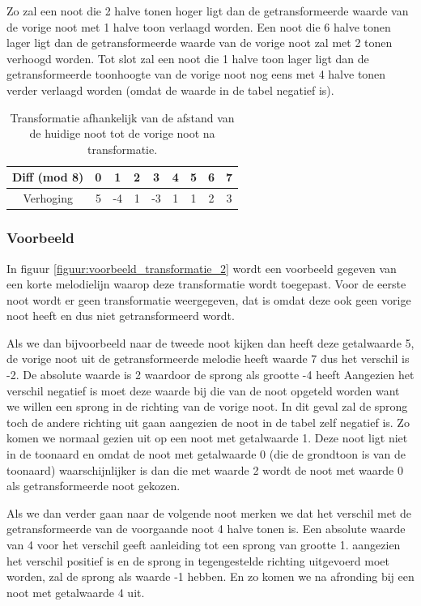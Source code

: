 Zo zal een noot die 2 halve tonen hoger ligt dan de getransformeerde waarde van de vorige noot met 1 halve toon verlaagd worden. Een noot die 6 halve tonen lager ligt dan de getransformeerde waarde van de vorige noot zal met 2 tonen verhoogd worden. Tot slot zal een noot die 1 halve toon lager ligt dan de getransformeerde toonhoogte van de vorige noot nog eens met 4 halve tonen verder verlaagd worden (omdat de waarde in de tabel negatief is).

\begin{table}
  \centering
  \begin{tabular}{c | c c c c c c c c }
    Diff (mod 8) & 0 & 1 & 2 & 3 & 4 & 5 & 6 & 7 \\
    \hline
    \hline
    Verhoging & 5 & -4 & 1 & -3 & 1 & 1 & 2 & 3 \\
  \end{tabular}
  \caption{Transformatie afhankelijk van de afstand van de huidige noot tot de vorige noot na transformatie.}
  \label{tabel:transformatie2}
\end{table}

\subsubsection{Voorbeeld}
In figuur \ref{figuur:voorbeeld_transformatie_2} wordt een voorbeeld gegeven van een korte melodielijn waarop deze transformatie wordt toegepast. Voor de eerste noot wordt er geen transformatie weergegeven, dat is omdat deze ook geen vorige noot heeft en dus niet getransformeerd wordt. 

Als we dan bijvoorbeeld naar de tweede noot kijken dan heeft deze getalwaarde 5, de vorige noot uit de getransformeerde melodie heeft waarde 7 dus het verschil is -2. De absolute waarde is 2 waardoor de sprong als grootte -4 heeft Aangezien het verschil negatief is moet deze waarde bij die van de noot opgeteld worden want we willen een sprong in de richting van de vorige noot. In dit geval zal de sprong toch de andere richting uit gaan aangezien de noot in de tabel zelf negatief is. Zo komen we normaal gezien uit op een noot met getalwaarde 1. Deze noot ligt niet in de toonaard en omdat de noot met getalwaarde 0 (die de grondtoon is van de toonaard) waarschijnlijker is dan die met waarde 2 wordt de noot met waarde 0 als getransformeerde noot gekozen. 

Als we dan verder gaan naar de volgende noot merken we dat het verschil met de getransformeerde van de voorgaande noot 4 halve tonen is. Een absolute waarde van 4 voor het verschil geeft aanleiding tot een sprong van grootte 1. aangezien het verschil positief is en de sprong in tegengestelde richting uitgevoerd moet worden, zal de sprong als waarde -1 hebben. En zo komen we na afronding bij een noot met getalwaarde 4 uit.

